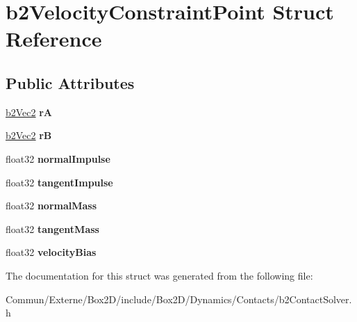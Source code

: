 \hypertarget{structb2_velocity_constraint_point}{}\section{b2\+Velocity\+Constraint\+Point Struct Reference}
\label{structb2_velocity_constraint_point}
\subsection*{Public Attributes}
\begin{DoxyCompactItemize}
\item 
\hyperlink{structb2_vec2}{b2\+Vec2} {\bfseries rA}\hypertarget{structb2_velocity_constraint_point_a0be704259cd5d3902d8581e186546e5e}{}\label{structb2_velocity_constraint_point_a0be704259cd5d3902d8581e186546e5e}

\item 
\hyperlink{structb2_vec2}{b2\+Vec2} {\bfseries rB}\hypertarget{structb2_velocity_constraint_point_ab5d1c98e09e2f859b71f6d0fda46c0d5}{}\label{structb2_velocity_constraint_point_ab5d1c98e09e2f859b71f6d0fda46c0d5}

\item 
float32 {\bfseries normal\+Impulse}\hypertarget{structb2_velocity_constraint_point_a304653be2ca1c1daa72d7b7868b37b11}{}\label{structb2_velocity_constraint_point_a304653be2ca1c1daa72d7b7868b37b11}

\item 
float32 {\bfseries tangent\+Impulse}\hypertarget{structb2_velocity_constraint_point_ac3e3be335d204bb6a89a7303831cc89b}{}\label{structb2_velocity_constraint_point_ac3e3be335d204bb6a89a7303831cc89b}

\item 
float32 {\bfseries normal\+Mass}\hypertarget{structb2_velocity_constraint_point_a5997e9781cedbd86333a84a967b59c33}{}\label{structb2_velocity_constraint_point_a5997e9781cedbd86333a84a967b59c33}

\item 
float32 {\bfseries tangent\+Mass}\hypertarget{structb2_velocity_constraint_point_a029692226a637f5e687022041b25043c}{}\label{structb2_velocity_constraint_point_a029692226a637f5e687022041b25043c}

\item 
float32 {\bfseries velocity\+Bias}\hypertarget{structb2_velocity_constraint_point_a81d492345d9b1c8f51ec10154ab840f2}{}\label{structb2_velocity_constraint_point_a81d492345d9b1c8f51ec10154ab840f2}

\end{DoxyCompactItemize}


The documentation for this struct was generated from the following file\+:\begin{DoxyCompactItemize}
\item 
Commun/\+Externe/\+Box2\+D/include/\+Box2\+D/\+Dynamics/\+Contacts/b2\+Contact\+Solver.\+h\end{DoxyCompactItemize}
